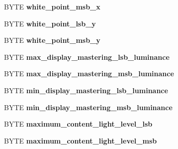 \begin{DoxyCompactItemize}
\item 
\hypertarget{struct__HDMI__HDR__INFOFRAME__PAYLOAD_aa67de31b8a9fc775776f26626ae094b8}{B\-Y\-T\-E {\bfseries white\-\_\-point\-\_\-msb\-\_\-x}}\label{struct__HDMI__HDR__INFOFRAME__PAYLOAD_aa67de31b8a9fc775776f26626ae094b8}

\item 
\hypertarget{struct__HDMI__HDR__INFOFRAME__PAYLOAD_a14c6b8effa35881ca94ee091b8dea294}{B\-Y\-T\-E {\bfseries white\-\_\-point\-\_\-lsb\-\_\-y}}\label{struct__HDMI__HDR__INFOFRAME__PAYLOAD_a14c6b8effa35881ca94ee091b8dea294}

\item 
\hypertarget{struct__HDMI__HDR__INFOFRAME__PAYLOAD_ad19b90d34cb3fc924553bff5b9e2e3c7}{B\-Y\-T\-E {\bfseries white\-\_\-point\-\_\-msb\-\_\-y}}\label{struct__HDMI__HDR__INFOFRAME__PAYLOAD_ad19b90d34cb3fc924553bff5b9e2e3c7}

\item 
\hypertarget{struct__HDMI__HDR__INFOFRAME__PAYLOAD_ad38037d29e428d80e9991c1e4c16bc5d}{B\-Y\-T\-E {\bfseries max\-\_\-display\-\_\-mastering\-\_\-lsb\-\_\-luminance}}\label{struct__HDMI__HDR__INFOFRAME__PAYLOAD_ad38037d29e428d80e9991c1e4c16bc5d}

\item 
\hypertarget{struct__HDMI__HDR__INFOFRAME__PAYLOAD_a83c844c8525a6cad16ec3ed4fac2ba41}{B\-Y\-T\-E {\bfseries max\-\_\-display\-\_\-mastering\-\_\-msb\-\_\-luminance}}\label{struct__HDMI__HDR__INFOFRAME__PAYLOAD_a83c844c8525a6cad16ec3ed4fac2ba41}

\item 
\hypertarget{struct__HDMI__HDR__INFOFRAME__PAYLOAD_a145bd440f3e040e31763b41afa6cc803}{B\-Y\-T\-E {\bfseries min\-\_\-display\-\_\-mastering\-\_\-lsb\-\_\-luminance}}\label{struct__HDMI__HDR__INFOFRAME__PAYLOAD_a145bd440f3e040e31763b41afa6cc803}

\item 
\hypertarget{struct__HDMI__HDR__INFOFRAME__PAYLOAD_af3f62605e6e0ff2d7a47cc005ad9a75a}{B\-Y\-T\-E {\bfseries min\-\_\-display\-\_\-mastering\-\_\-msb\-\_\-luminance}}\label{struct__HDMI__HDR__INFOFRAME__PAYLOAD_af3f62605e6e0ff2d7a47cc005ad9a75a}

\item 
\hypertarget{struct__HDMI__HDR__INFOFRAME__PAYLOAD_a0bf9c2adcedd58bb14eb83a178573253}{B\-Y\-T\-E {\bfseries maximum\-\_\-content\-\_\-light\-\_\-level\-\_\-lsb}}\label{struct__HDMI__HDR__INFOFRAME__PAYLOAD_a0bf9c2adcedd58bb14eb83a178573253}

\item 
\hypertarget{struct__HDMI__HDR__INFOFRAME__PAYLOAD_a631cac84e6a2e14b9e3fb24c6675d2e4}{B\-Y\-T\-E {\bfseries maximum\-\_\-content\-\_\-light\-\_\-level\-\_\-msb}}\label{struct__HDMI__HDR__INFOFRAME__PAYLOAD_a631cac84e6a2e14b9e3fb24c6675d2e4}


\end{DoxyCompactItemize}
